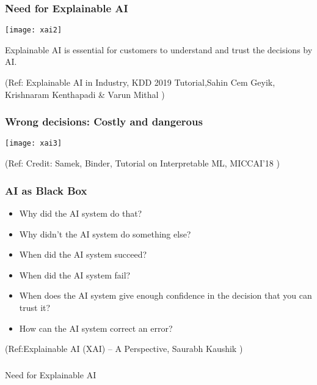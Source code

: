 \begin{frame}[fragile]\frametitle{Need for Explainable AI}
\begin{center}
\texttt{[image: xai2]}
\end{center}

Explainable AI is essential for customers to understand and trust the decisions by AI.

\tiny{(Ref: Explainable AI in Industry, KDD 2019 Tutorial,Sahin Cem Geyik, Krishnaram Kenthapadi \& Varun Mithal  )}

\end{frame}

\begin{frame}[fragile]\frametitle{Wrong decisions: Costly and dangerous}
\begin{center}
\texttt{[image: xai3]}
\end{center}

\tiny{(Ref: Credit: Samek, Binder, Tutorial on Interpretable ML, MICCAI'18 )}

\end{frame}

\begin{frame}[fragile]\frametitle{AI as Black Box }
\begin{itemize}
\item Why did the AI system do that?
\item Why didn't the AI system do something else?
\item When did the AI system succeed?
\item When did the AI system fail?
\item When does the AI system give enough confidence in the decision that you can trust it?
\item How can the AI system correct an error?
\end{itemize}

\tiny{(Ref:Explainable AI (XAI) – A Perspective, Saurabh Kaushik  )}

\end{frame}

\begin{frame}[fragile]\frametitle{}
\begin{center}
{\Large Need for Explainable AI}
\end{center}
\end{frame}

